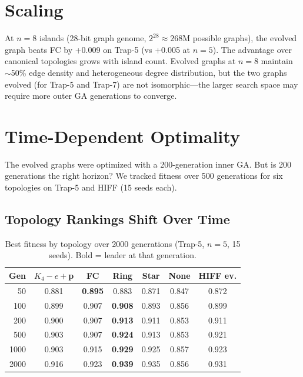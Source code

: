 \documentclass[sigconf,nonacm]{acmart}
\begin{document}
\section{Scaling}
\label{sec:scaling}


At $n = 8$ islands (28-bit graph genome, $2^{28} \approx 268$M
possible graphs), the evolved graph beats FC by +0.009 on Trap-5
(vs +0.005 at $n = 5$). The advantage over canonical topologies
grows with island count. Evolved graphs at $n = 8$ maintain
$\sim$50\% edge density and heterogeneous degree distribution, but
the two graphs evolved (for Trap-5 and Trap-7) are not isomorphic---the
larger search space may require more outer GA generations to converge.


\section{Time-Dependent Optimality}
\label{sec:time}

The evolved graphs were optimized with a 200-generation inner GA.
But is 200 generations the right horizon? We tracked fitness over
500 generations for six topologies on Trap-5 and HIFF (15 seeds each).

\subsection{Topology Rankings Shift Over Time}

\begin{table}[h]
\caption{Best fitness by topology over 2000 generations (Trap-5,
  $n=5$, 15 seeds). Bold = leader at that generation.}
\label{tab:convergence}
\centering
\small
\begin{tabular}{rcccccc}
\toprule
\textbf{Gen} & \textbf{$K_4{-}e{+}$p} & \textbf{FC} & \textbf{Ring} & \textbf{Star} & \textbf{None} & \textbf{HIFF ev.} \\
\midrule
 50  & 0.881 & \textbf{0.895} & 0.883 & 0.871 & 0.847 & 0.872 \\
100  & 0.899 & 0.907 & \textbf{0.908} & 0.893 & 0.856 & 0.899 \\
200  & 0.900 & 0.907 & \textbf{0.913} & 0.911 & 0.853 & 0.911 \\
500  & 0.903 & 0.907 & \textbf{0.924} & 0.913 & 0.853 & 0.921 \\
1000 & 0.903 & 0.915 & \textbf{0.929} & 0.925 & 0.857 & 0.923 \\
2000 & 0.916 & 0.923 & \textbf{0.939} & 0.935 & 0.856 & 0.931 \\
\bottomrule
\end{tabular}
\end{table}
\end{document}
